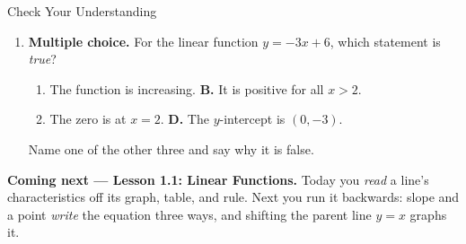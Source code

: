 \documentclass[12pt]{article}
\newcommand{\answerspace}[2]{\par\nopagebreak\noindent\begin{minipage}[t][#1][t]{\linewidth}%
  \color{keyred}\bfseries #2\end{minipage}\par}
\begin{document}
\begin{notesbox}{Check Your Understanding }
\begin{enumerate}[leftmargin=1.7em, itemsep=4pt]
  \item \textbf{Multiple choice.} For the linear function $y = -3x + 6$, which statement is
        \emph{true}?
    \begin{enumerate}[label=\Alph*., leftmargin=2.2em, itemsep=1pt]
      \item[\textbf{A.}] The function is increasing. \hfill
            \textbf{B.} It is positive for all $x > 2$.
      \item[\textbf{C.}] The zero is at $x = 2$. \hfill
            \textbf{D.} The $y$-intercept is $(0,-3)$.
    \end{enumerate}
    Name one of the other three and say why it is false.
    \answerspace{1.4cm}{}
\end{enumerate}
\end{notesbox}

\boxguard[6]
\begin{spiralbox}
\textbf{Coming next --- Lesson 1.1: Linear Functions.} Today you \emph{read} a line's characteristics
off its graph, table, and rule. Next you run it backwards: slope and a point \emph{write} the
equation three ways, and shifting the parent line $y=x$ graphs it.
\end{spiralbox}
\end{document}
